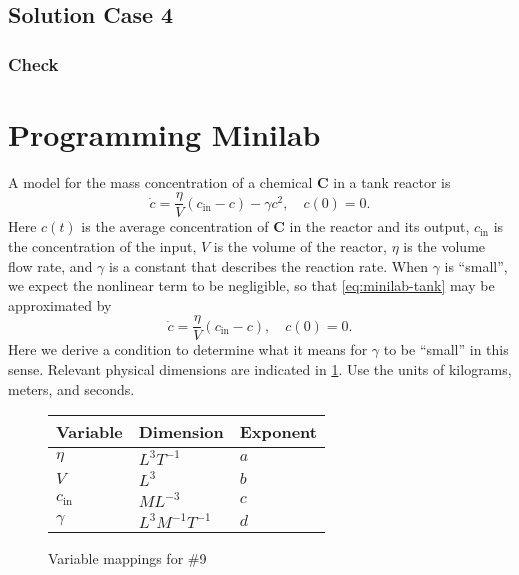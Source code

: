 \documentclass[12pt]{article}
\begin{document}
\subsection*{Solution Case 4}
\todo
\subsubsection*{Check}
\todo

\section{Programming Minilab}
A model for the mass concentration of a chemical \textbf{C} in a tank reactor is
\begin{equation}
  \label{eq:minilab-tank}
  \dot{c} = \frac{\eta}{V}(c_{\text{in}}-c)-\gamma c^2,\quad c(0)=0.
\end{equation}
Here $c(t)$ is the average concentration of \textbf{C} in the reactor and its
output, $c_{\text{in}}$ is the concentration of the input, $V$ is the volume of
the reactor, $\eta$ is the volume flow rate, and $\gamma$ is a constant that
describes the reaction rate. When $\gamma$ is ``small'', we expect the nonlinear
term to be negligible, so that \cref{eq:minilab-tank} may be approximated by
\begin{equation}
  \label{eq:minilab-tank-approx}
  \dot{c} = \frac{\eta}{V}(c_{\text{in}}-c),\quad c(0)=0.
\end{equation}
Here we derive a condition to determine what it means for $\gamma$ to be
``small'' in this sense. Relevant physical dimensions are indicated in
\cref{fig:minilab-var-mappings}. Use the units of kilograms, meters, and
seconds.

\begin{figure}
  \centering
  \begin{tabularx}{0.5\textwidth}{XXX}
    Variable & Dimension & Exponent \\ \hline
    $\eta$ & $L^3T^{-1}$ & $a$ \\
    $V$ & $L^3$ & $b$ \\
    $c_{\text{in}}$ & $ML^{-3}$ & $c$ \\
    $\gamma$ & $L^3M^{-1}T^{-1}$ & $d$ \\
  \end{tabularx}
  \caption{Variable mappings for \#9}
  \label{fig:minilab-var-mappings}
\end{figure}

\newpage
\subsection{}
\label{sec:minilab-first-problem}
\end{document}
